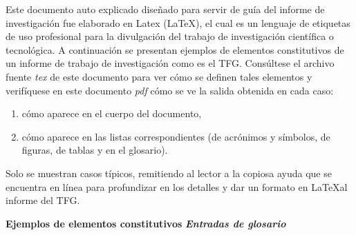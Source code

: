Este documento auto explicado diseñado para servir de guía del informe de investigación fue elaborado en Latex (\LaTeX), el cual es un lenguaje de etiquetas de uso profesional para la divulgación del trabajo de investigación científica o tecnológica. A continuación se presentan ejemplos de elementos constitutivos de un informe de trabajo de investigación como es el TFG. Consúltese el archivo fuente \textit{tex} de este documento para ver cómo se definen tales elementos y verifíquese en este documento \textit{pdf} cómo se ve la salida obtenida en cada caso:
\begin{enumerate}
\item cómo aparece en el cuerpo del documento,
\item cómo aparece en las listas correspondientes (de acrónimos y símbolos, de figuras, de tablas y en el glosario).
\end{enumerate}
Solo se muestran casos típicos, remitiendo al lector a la copiosa ayuda que se encuentra en línea para profundizar en los detalles y dar un formato en \LaTeX\space al informe del TFG.


\textbf{Ejemplos de elementos constitutivos}
\textit{\textbf{Entradas de glosario}}

